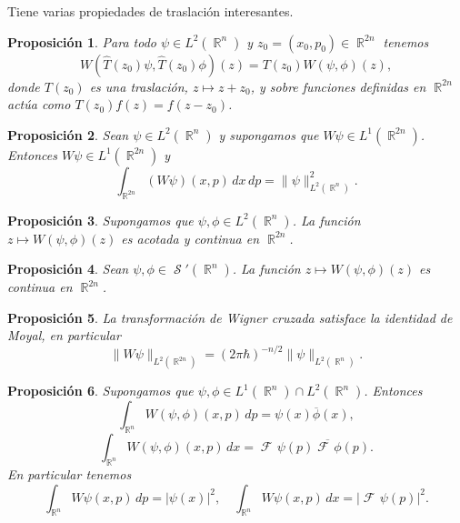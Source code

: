 \documentclass[a4paper]{report}
\DeclareMathOperator{\R}{\mathbb{R}}
\DeclareMathOperator{\Sz}{\mathcal S}
\DeclareMathOperator{\Fr}{\mathcal{F}\!}
\newtheorem{proposition}{Proposición}
\begin{document}
  Tiene varias propiedades de traslación interesantes. 
  \begin{proposition}
    Para todo $\psi \in L^2(\R^{n})$ y $z_0 = (x_0,p_0) \in
    \R^{2n}$ tenemos
    \[
      W(\hat{T}(z_0)\psi, \hat{T}(z_0)\phi)(z)
      = T(z_0)W(\psi,\phi)(z),
    \] 
    donde $T(z_0)$ es una traslación, $z \mapsto z + z_0$, y
    sobre funciones definidas en $\R^{2n}$ actúa como
    $T(z_0)f(z) = f(z-z_0)$.
  \end{proposition}
  
  \begin{proposition}
    Sean $\psi \in L^2(\R^{n})$ y supongamos que $W\psi \in
    L^{1}(\R^{2n})$. Entonces $W\psi \in L^{1}(\R^{2n})$ y
    \begin{equation}
      \int_{\R^{2n}} (W\psi)(x,p) \, dx \, dp 
      = \|\psi\|^2_{L^2(\R^{n})}.
    \end{equation}
  \end{proposition}

  \begin{proposition}
    Supongamos que $\psi, \phi \in L^2(\R^{n})$. La función
    $z \mapsto W(\psi,\phi)(z)$ es acotada y continua en
    $\R^{2n}$.
  \end{proposition}

  \begin{proposition}
    Sean $\psi,\phi \in \Sz'(\R^{n})$. La función $z
    \mapsto W(\psi,\phi)(z)$ es continua en $\R^{2n}$.
  \end{proposition}

  \begin{proposition}
    La transformación de Wigner cruzada satisface la
    identidad de Moyal, en particular
    \begin{equation}
      \|W\psi\|_{L^2(\R^{2n})}
      = (2\pi\hbar)^{-n / 2} \|\psi\|_{L^2(\R^{n})}.
    \end{equation}
  \end{proposition}

  \begin{proposition}
    Supongamos que $\psi, \phi \in L^{1}(\R^{n}) \cap
    L^2(\R^{n})$. Entonces
    \begin{equation}
      \int_{\R^{n}} W(\psi,\phi)(x,p) \, dp
      = \psi(x)\overline{\phi}(x),
    \end{equation}
    \begin{equation}
      \int_{\R^{n}} W(\psi,\phi)(x,p) \, dx
      = \Fr\psi(p) \overline{\Fr\phi}(p).
    \end{equation}
    En particular tenemos
    \begin{equation}
      \int_{\R^{n}} W\psi(x,p) \, dp
      = |\psi(x)|^2,
      \quad
      \int_{\R^{n}} W\psi(x,p) \, dx
      = |\Fr\psi(p)|^2.
    \end{equation}
  \end{proposition}
\end{document}
